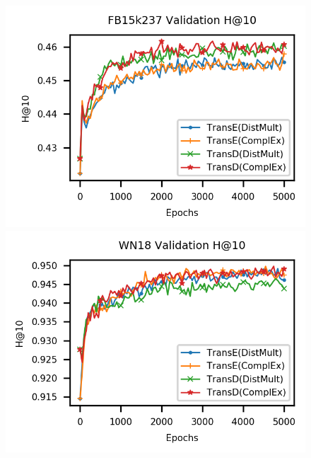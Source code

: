 \begin{figure}
    \begin{minipage}{.3\textwidth}
      \centering
      \includegraphics[width=\linewidth]{appendices/figures/original_results/FB15k237_H10.png}
    \end{minipage}%
     \begin{minipage}{.3\textwidth}
      \centering
      \includegraphics[width=\linewidth]{appendices/figures/original_results/WN18_H10.png}
    \end{minipage}%
     \begin{minipage}{.3\textwidth}
      \centering

\end{minipage}
\end{figure}
